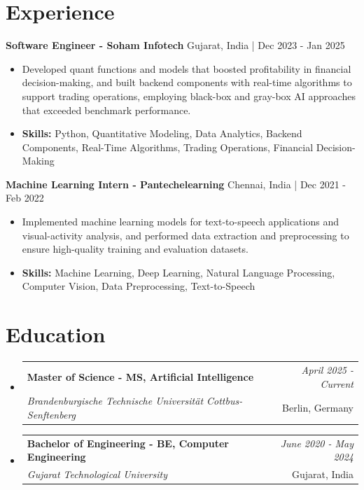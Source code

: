 \documentclass[a4paper,11pt]{article}
\makeatletter
\newcommand{\resumeSubheading}[4]{
\vspace{0.5mm}\item
    \begin{tabular*}{\linewidth}[t]{l@{\extracolsep{\fill}}r}
        \textbf{#1} & \textit{\footnotesize{#4}} \\
        \textit{\footnotesize{#3}} &  \footnotesize{#2}\\
    \end{tabular*}
    \vspace{-2.4mm}
}
\makeatother
\begin{document}
\section{\textbf{Experience}}


\vspace{1mm}
  \textbf{Software Engineer - Soham Infotech} \hfill Gujarat, India | Dec 2023 - Jan 2025
\vspace{-1.5mm} %
\begin{itemize}
  \item Developed quant functions and models that boosted profitability in financial decision-making, and built backend components with real-time algorithms to support trading operations, employing black-box and gray-box AI approaches that exceeded benchmark performance.

\vspace{-2mm}
  \item \textbf{Skills:} Python, Quantitative Modeling, Data Analytics, Backend Components, Real-Time Algorithms, Trading Operations, Financial Decision-Making
\end{itemize}

\vspace{1mm}
  \textbf{Machine Learning Intern - Pantechelearning} \hfill Chennai, India | Dec 2021 - Feb 2022
\vspace{-1.5mm} %
\begin{itemize}
  \item Implemented machine learning models for text-to-speech applications and visual-activity analysis, and performed data extraction and preprocessing to ensure high-quality training and evaluation datasets.
\vspace{-2mm}
  \item \textbf{Skills:} Machine Learning, Deep Learning, Natural Language Processing, Computer Vision, Data Preprocessing, Text-to-Speech
\end{itemize}\section{\textbf{Education}}
\vspace{-0.4mm}

\begin{itemize}[leftmargin=0.15in, label={}]
\resumeSubheading
{Master of Science - MS, Artificial Intelligence }{Berlin, Germany}
{Brandenburgische Technische Universität Cottbus-Senftenberg  }{April 2025 - Current}

\vspace{1.0mm} %
\resumeSubheading
{Bachelor of Engineering - BE, Computer Engineering  }{Gujarat, India}
{Gujarat Technological University }{June 2020 - May 2024}

\end{itemize}
\end{document}
